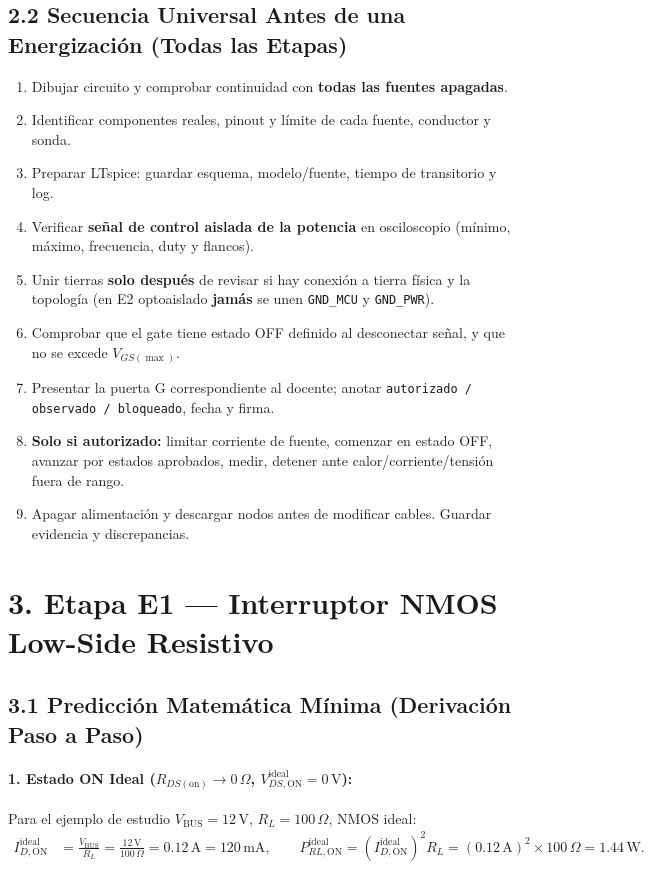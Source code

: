 \documentclass[10pt, a4paper, landscape]{article}
\begin{document}
\subsection*{2.2 Secuencia Universal Antes de una Energización (Todas las Etapas)}
\begin{enumerate}[noitemsep, topsep=2pt]
    \item Dibujar circuito y comprobar continuidad con \textbf{todas las fuentes apagadas}.
    \item Identificar componentes reales, pinout y límite de cada fuente, conductor y sonda.
    \item Preparar LTspice: guardar esquema, modelo/fuente, tiempo de transitorio y log.
    \item Verificar \textbf{señal de control aislada de la potencia} en osciloscopio (mínimo, máximo, frecuencia, duty y flancos).
    \item Unir tierras \textbf{solo después} de revisar si hay conexión a tierra física y la topología (en E2 optoaislado \textbf{jamás} se unen \texttt{GND\_MCU} y \texttt{GND\_PWR}).
    \item Comprobar que el gate tiene estado OFF definido al desconectar señal, y que no se excede $V_{GS(\max)}$.
    \item Presentar la puerta G correspondiente al docente; anotar \texttt{autorizado / observado / bloqueado}, fecha y firma.
    \item \textbf{Solo si autorizado:} limitar corriente de fuente, comenzar en estado OFF, avanzar por estados aprobados, medir, detener ante calor/corriente/tensión fuera de rango.
    \item Apagar alimentación y descargar nodos antes de modificar cables. Guardar evidencia y discrepancias.
\end{enumerate}

\newpage
\section*{3. Etapa E1 — Interruptor NMOS Low-Side Resistivo}

\subsection*{3.1 Predicción Matemática Mínima (Derivación Paso a Paso)}

\paragraph{1. Estado ON Ideal ($R_{DS(\text{on})} \rightarrow 0\,\Omega$, $V_{DS,\text{ON}}^{\text{ideal}} = 0\,\text{V}$):}
Para el ejemplo de estudio $V_{\text{BUS}} = 12\,\text{V}$, $R_L = 100\,\Omega$, NMOS ideal:
\begin{align}
    I_{D,\text{ON}}^{\text{ideal}} &= \frac{V_{\text{BUS}}}{R_L} = \frac{12\,\text{V}}{100\,\Omega} = 0.12\,\text{A} = 120\,\text{mA}, \qquad P_{RL,\text{ON}}^{\text{ideal}} = \left(I_{D,\text{ON}}^{\text{ideal}}\right)^2 R_L = (0.12\,\text{A})^2 \times 100\,\Omega = 1.44\,\text{W}.
\end{align}
\end{document}
